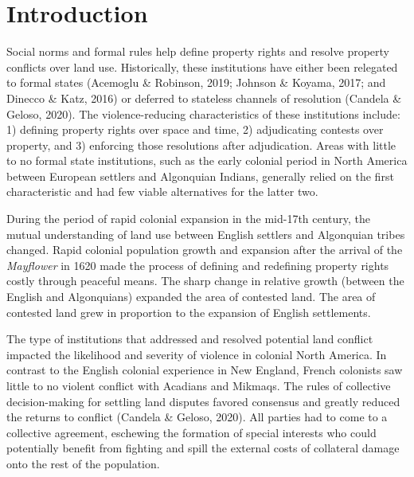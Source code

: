 \documentclass[sn-mathphys]{sn-jnl}%
\theoremstyle{thmstyleone}%
\theoremstyle{thmstyletwo}%
\theoremstyle{thmstylethree}%
\begin{document}
\section{Introduction}\label{sec1}

Social norms and formal rules help define property rights and resolve property conflicts over land use. Historically, these institutions have either been relegated to formal states %
(Acemoglu \& Robinson, 2019; Johnson \& Koyama, 2017; and Dinecco \& Katz, 2016) or deferred to stateless channels of resolution (Candela \& Geloso, 2020). The violence-reducing characteristics of these institutions include: 1) defining property rights over space and time, 2) adjudicating contests over property, and 3) enforcing those resolutions after adjudication. Areas with little to no formal state institutions, such as the early colonial period in North America between European settlers and Algonquian Indians, generally relied on the first characteristic and had few viable alternatives for the latter two. 

During the period of rapid colonial expansion in the mid-17th century, the mutual understanding of land use between English settlers and Algonquian tribes changed. Rapid colonial population growth and expansion after the arrival of the {\em Mayflower} in 1620 made the process of defining and redefining property rights costly through peaceful means. The sharp change in relative growth (between the English and Algonquians) expanded the area of contested land. The area of contested land grew in proportion to the expansion of English settlements.

The type of institutions that addressed and resolved potential land conflict impacted the likelihood and severity of violence in colonial North America. In contrast to the English colonial experience in New England, French colonists saw little to no violent conflict with Acadians and Mikmaqs. The rules of collective decision-making for settling land disputes favored consensus and greatly reduced the returns to conflict (Candela \& Geloso, 2020). All parties had to come to a collective agreement, eschewing the formation of special interests who could potentially benefit from fighting and spill the external costs of collateral damage onto the rest of the population. 
\end{document}
